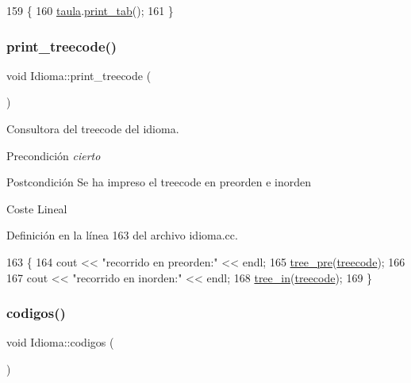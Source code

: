 \begin{DoxyCode}
159                   \{
160   \hyperlink{class_idioma_a5e144ffaa4c1c63690e08e4e2687a13f}{taula}.\hyperlink{class_tab_freq_a20d75c460199ab8ef3e189d9ad81c05b}{print\_tab}();
161 \}
\end{DoxyCode}
\mbox{\label{class_idioma_a62777b96c5fcdbcf3fa9a5ebafe45988}} 
\subsubsection{\texorpdfstring{print\+\_\+treecode()}{print\_treecode()}}
{\footnotesize\ttfamily void Idioma\+::print\+\_\+treecode (\begin{DoxyParamCaption}{ }\end{DoxyParamCaption})}



Consultora del treecode del idioma. 

\begin{DoxyPrecond}{Precondición}
{\itshape cierto} 
\end{DoxyPrecond}
\begin{DoxyPostcond}{Postcondición}
Se ha impreso el treecode en preorden e inorden 
\end{DoxyPostcond}
\begin{DoxyParagraph}{Coste}
Lineal 
\end{DoxyParagraph}


Definición en la línea 163 del archivo idioma.\+cc.


\begin{DoxyCode}
163                            \{
164   cout << \textcolor{stringliteral}{"recorrido en preorden:"} << endl;
165   \hyperlink{class_idioma_aaf85e226b876366ea2cb1ebf5cf04388}{tree\_pre}(\hyperlink{class_idioma_a5eeaf73b2498503c5c686ac259e1f675}{treecode});
166 
167   cout << \textcolor{stringliteral}{"recorrido en inorden:"} << endl;
168   \hyperlink{class_idioma_a1fdf7b5bae642b911ab51b100f56e55f}{tree\_in}(\hyperlink{class_idioma_a5eeaf73b2498503c5c686ac259e1f675}{treecode});
169 \}
\end{DoxyCode}
\mbox{\label{class_idioma_a2b615f7b30362bfc20e6319835017031}} 
\subsubsection{\texorpdfstring{codigos()}{codigos()}}
{\footnotesize\ttfamily void Idioma\+::codigos (\begin{DoxyParamCaption}{ }\end{DoxyParamCaption})}



